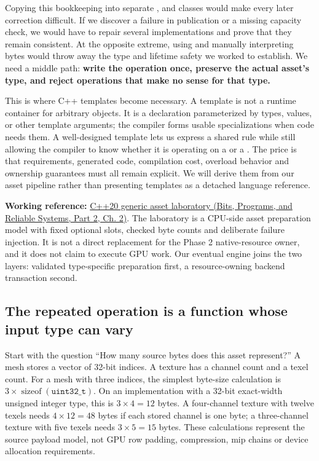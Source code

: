 Copying this bookkeeping into separate ,  and  classes would make every later correction difficult. If we discover a failure in publication or a missing capacity check, we would have to repair several implementations and prove that they remain consistent. At the opposite extreme, using  and manually interpreting bytes would throw away the type and lifetime safety we worked to establish. We need a middle path: \textbf{write the operation once, preserve the actual asset's type, and reject operations that make no sense for that type.}

This is where C++ templates become necessary. A template is not a runtime container for arbitrary objects. It is a declaration parameterized by types, values, or other template arguments; the compiler forms usable specializations when code needs them. A well-designed template lets us express a shared rule while still allowing the compiler to know whether it is operating on a  or a . The price is that requirements, generated code, compilation cost, overload behavior and ownership guarantees must all remain explicit. We will derive them from our asset pipeline rather than presenting templates as a detached language reference.

\textbf{Working reference:} \href{../01-Bits-Programs-and-Reliable-Systems-P02/main.pdf\#nameddest=source-file-a5db53514d74ae247b4ac42f}{C++20 generic asset laboratory (Bits, Programs, and Reliable Systems, Part 2, Ch. 2)}. The laboratory is a CPU-side asset preparation model with fixed optional slots, checked byte counts and deliberate failure injection. It is not a direct replacement for the Phase 2 native-resource owner, and it does not claim to execute GPU work. Our eventual engine joins the two layers: validated type-specific preparation first, a resource-owning backend transaction second.

\subsection{The repeated operation is a function whose input type can vary}\label{01-foundations-i-ch005-the-repeated-operation-is-a-function-whose-input-type-can-vary}

\hypertarget{01-foundations-i-ch005-the-repeated-operation-is-a-function-whose-input-type-can-vary}{}

Start with the question ``How many source bytes does this asset represent?'' A mesh stores a vector of 32-bit indices. A texture has a channel count and a texel count. For a mesh with three indices, the simplest byte-size calculation is \(3\times\operatorname{sizeof}(\texttt{uint32\_t})\). On an implementation with a 32-bit exact-width unsigned integer type, this is \(3\times4=12\) bytes. A four-channel texture with twelve texels needs \(4\times12=48\) bytes if each stored channel is one byte; a three-channel texture with five texels needs \(3\times5=15\) bytes. These calculations represent the source payload model, not GPU row padding, compression, mip chains or device allocation requirements.

